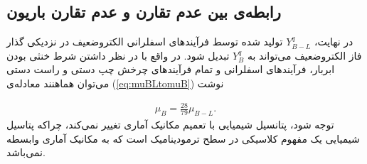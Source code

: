 \documentclass[a4paper]{book}
\begin{document}
\subsection{رابطه‌ی بین عدم تقارن  و عدم تقارن باریون}
در نهایت، {\footnotesize$Y^q_{B-L}$} تولید شده توسط فرآیندهای اسفلرانی الکتروضعیف در نزدیکی گذار فاز الکتروضعیف می‌تواند به {\footnotesize$Y^q_B$} تبدیل شود. در واقع با در نظر داشتن شرط خنثی بودن ابربار، فرآیندهای اسفلرانی و تمام فرآیندهای چرخش چپ دستی و راست دستی می‌توان هماهنند معادله‌ی (\ref{eq:muBLtomuB}) نوشت
\par
\vspace{-0.5cm}
{\footnotesize\begin{align}
	\mu_B = \frac{28}{79} \mu_{B-L}.
	\label{eq:chemical-condition-nonextensive}
\end{align}}
توجه شود، پتانسیل شیمیایی با تعمیم مکانیک آماری تغییر نمی‌کند، چراکه پتاسیل شیمیایی یک مفهوم کلاسیکی در سطح ترمودینامیک است که به مکانیک آماری وابسطه نمی‌باشد.
\end{document}
